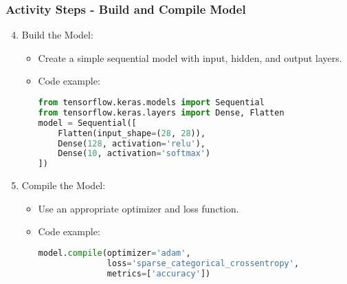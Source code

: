 \documentclass[aspectratio=169]{beamer}
\begin{document}
\begin{frame}[fragile]
    \frametitle{Activity Steps - Build and Compile Model}
    \begin{enumerate}
        \setcounter{enumi}{3}
        \item Build the Model:
        \begin{itemize}
            \item Create a simple sequential model with input, hidden, and output layers.
            \item Code example:
            \begin{lstlisting}[language=python]
from tensorflow.keras.models import Sequential
from tensorflow.keras.layers import Dense, Flatten
model = Sequential([
    Flatten(input_shape=(28, 28)),
    Dense(128, activation='relu'),
    Dense(10, activation='softmax')
])
            \end{lstlisting}
        \end{itemize}

        \item Compile the Model:
        \begin{itemize}
            \item Use an appropriate optimizer and loss function.
            \item Code example:
            \begin{lstlisting}[language=python]
model.compile(optimizer='adam',
              loss='sparse_categorical_crossentropy',
              metrics=['accuracy'])
            \end{lstlisting}
        \end{itemize}
    \end{enumerate}
\end{frame}
\end{document}

